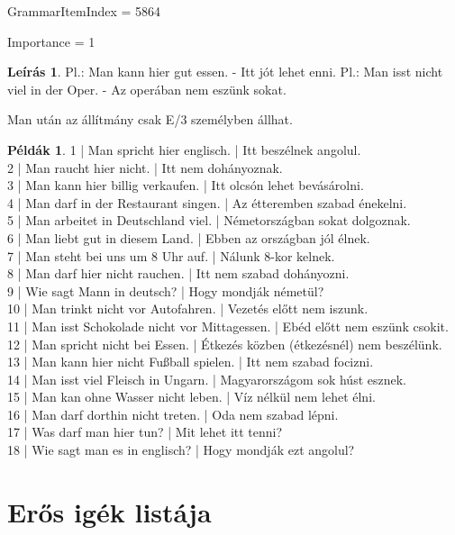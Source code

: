 \documentclass{article}
\theoremstyle{definition}
\newtheorem*{exmp}{Példák}
\newtheorem*{desc}{Leírás}
\begin{document}
GrammarItemIndex = 5864

Importance = 1

\begin{desc}
Pl.: Man kann hier gut essen. - Itt jót lehet enni.
Pl.: Man isst nicht viel in der Oper. - Az operában nem eszünk sokat. 

Man után az állítmány csak E/3 személyben állhat.
\end{desc}

\begin{exmp}
1 | Man spricht hier englisch. | Itt beszélnek angolul.\\
2 | Man raucht hier nicht. | Itt nem dohányoznak.\\
3 | Man kann hier billig verkaufen. | Itt olcsón lehet bevásárolni.\\
4 | Man darf in der Restaurant singen. | Az étteremben szabad énekelni.\\
5 | Man arbeitet in Deutschland viel. | Németországban sokat dolgoznak.\\
6 | Man liebt gut in diesem Land. | Ebben az országban jól élnek.\\
7 | Man steht bei uns um 8 Uhr auf. | Nálunk 8-kor kelnek.\\
8 | Man darf hier nicht rauchen. | Itt nem szabad dohányozni.\\
9 | Wie sagt Mann in deutsch? | Hogy mondják németül?\\
10 | Man trinkt nicht vor Autofahren. | Vezetés előtt nem iszunk.\\
11 | Man isst Schokolade nicht vor Mittagessen. | Ebéd előtt nem eszünk csokit.\\
12 | Man spricht nicht bei Essen. | Étkezés közben (étkezésnél) nem beszélünk.\\
13 | Man kann hier nicht Fußball spielen. | Itt nem szabad focizni.\\
14 | Man isst viel Fleisch in Ungarn. | Magyarországom sok húst esznek.\\
15 | Man kan ohne Wasser nicht leben. | Víz nélkül nem lehet élni.\\
16 | Man darf dorthin nicht treten. | Oda nem szabad lépni.\\
17 | Was darf man hier tun? | Mit lehet itt tenni?\\
18 | Wie sagt man es in englisch? | Hogy mondják ezt angolul?\\
\end{exmp}

\section{Erős igék listája}
\end{document}
